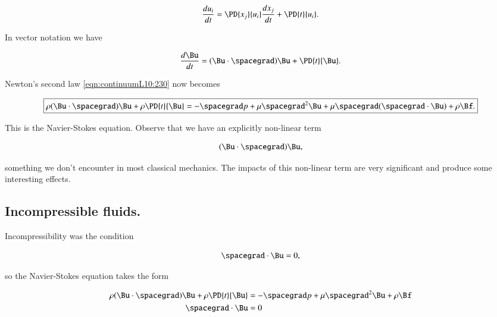 \begin{equation}\label{eqn:continuumL10:270}
\frac{du_i}{dt} = \PD{x_j}{u_i} \frac{dx_j}{dt} + \PD{t}{u_i} .
\end{equation}

In vector notation we have

\begin{equation}\label{eqn:continuumL10:290}
\frac{d\Bu}{dt} = (\Bu \cdot \spacegrad) \Bu + \PD{t}{\Bu}.
\end{equation}

Newton's second law \ref{eqn:continuumL10:230} now becomes

\begin{equation}\label{eqn:continuumL10:230b}
\boxed{
\rho 
 (\Bu \cdot \spacegrad) \Bu + \rho \PD{t}{\Bu} 
= -\spacegrad p + \mu \spacegrad^2 \Bu 
+ \mu \spacegrad (\spacegrad \cdot \Bu) + \rho \Bf.
}
\end{equation}

This is the Navier-Stokes equation.  Observe that we have an explicitly non-linear term

\begin{equation}\label{eqn:continuumL10:310}
(\Bu \cdot \spacegrad) \Bu ,
\end{equation}

something we don't encounter in most classical mechanics.  The impacts of this non-linear term are very significant and produce some interesting effects.

\subsection{Incompressible fluids.}

Incompressibility was the condition

\begin{equation}\label{eqn:continuumL10:330}
\spacegrad \cdot \Bu = 0,
\end{equation}

so the Navier-Stokes equation takes the form

\begin{equation}\label{eqn:continuumL10:230c}
\begin{aligned}
\rho 
 (\Bu \cdot \spacegrad) \Bu + \rho \PD{t}{\Bu} 
&= -\spacegrad p + \mu \spacegrad^2 \Bu 
+ \rho \Bf \\
\spacegrad \cdot \Bu &= 0
\end{aligned}
\end{equation}

